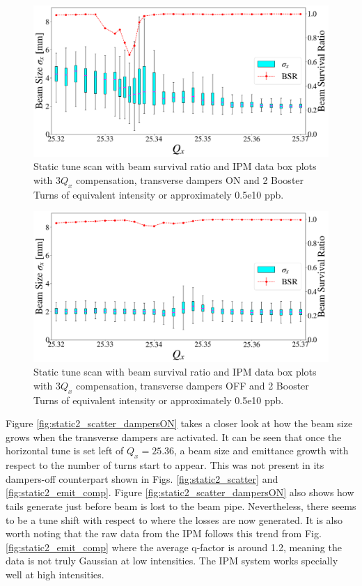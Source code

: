 \newpage
\begin{figure}[H]
    \centering
    \includegraphics[width=\columnwidth]{chapter6/static2turns_ipm_dampersON.png}
    \caption{Static tune scan with beam survival ratio and IPM data box plots with $3Q_x$ compensation, transverse dampers ON and 2 Booster Turns of equivalent intensity or approximately 0.5e10 ppb.}
    \label{fig:static2_dampersON}
\end{figure}

\begin{figure}[H]
    \centering
    \includegraphics[width=\columnwidth]{chapter6/static2turns_ipm_dampersOFF.png}
    \caption{Static tune scan with beam survival ratio and IPM data box plots with $3Q_x$ compensation, transverse dampers OFF and 2 Booster Turns of equivalent intensity or approximately 0.5e10 ppb.}
    \label{fig:static2_dampersOFF}
\end{figure}
\newpage

Figure \ref{fig:static2_scatter_dampersON} takes a closer look at how the beam size grows when the transverse dampers are activated. It can be seen that once the horizontal tune is set left of $Q_x=25.36$, a beam size and emittance growth with respect to the number of turns start to appear. This was not present in its dampers-off counterpart shown in Figs. \ref{fig:static2_scatter} and \ref{fig:static2_emit_comp}. Figure \ref{fig:static2_scatter_dampersON} also shows how tails generate just before beam is lost to the beam pipe. Nevertheless, there seems to be a tune shift with respect to where the losses are now generated. It is also worth noting that the raw data from the IPM follows this trend from Fig. \ref{fig:static2_emit_comp} where the average q-factor is around 1.2, meaning the data is not truly Gaussian at low intensities. The IPM system works specially well at high intensities. 

